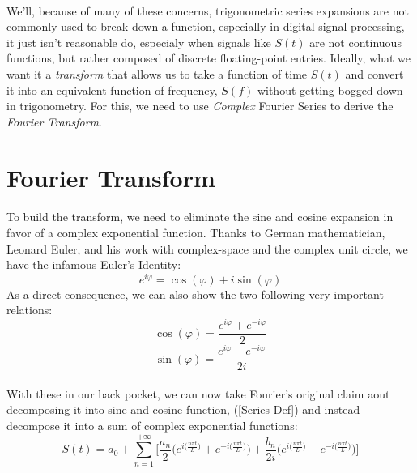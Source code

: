 \documentclass[12pt,letterpaper]{article}
\begin{document}
\paragraph*{}We'll, because of many of these concerns, trigonometric series expansions are not commonly used to break down a function, especially in digital signal processing, it just isn't reasonable do, especialy when signals like $S(t)$ are not continuous functions, but rather composed of discrete floating-point entries. Ideally, what we want it a \textit{transform} that allows us to take a function of time $S(t)$ and convert it into an equivalent function of frequency, $S(f)$ without getting bogged down in trigonometry. For this, we need to use \textit{Complex} Fourier Series to derive the \textit{Fourier Transform}.


\section*{Fourier Transform}
\paragraph*{}To build the transform, we need to eliminate the sine and cosine expansion in favor of a complex exponential function. Thanks to German mathematician, Leonard Euler, and his work with complex-space and the complex unit circle, we have the infamous Euler's Identity:
\begin{equation}
\label{Euler}
e^{i\varphi} = \cos(\varphi) + i\sin(\varphi)
\end{equation}
As a direct consequence, we can also show the two following very important relations:
\begin{equation}
\cos(\varphi) = \frac{e^{i\varphi} + e^{-i\varphi}}{2}
\end{equation}
\begin{equation}
\sin(\varphi) = \frac{e^{i\varphi} - e^{-i\varphi}}{2i}
\end{equation}
\paragraph*{}With these in our back pocket, we can now take Fourier's original claim aout decomposing it into sine and cosine function, (\ref{Series Def}) and instead decompose it into a sum of complex exponential functions:
\begin{equation}
S(t) = a_0 +  \sum_{n=1}^{+\infty} \Bigg[
\frac{a_n}{2} \Big( e^{i\big(\frac{n\pi t}{L}\big)} + e^{-i\big(\frac{n\pi t}{L}\big)} \Big)+
\frac{b_n}{2i}\Big( e^{i\big(\frac{n\pi t}{L}\big)} - e^{-i\big(\frac{n\pi t}{L}\big)} \Big)\Bigg]
\end{equation}
\end{document}
